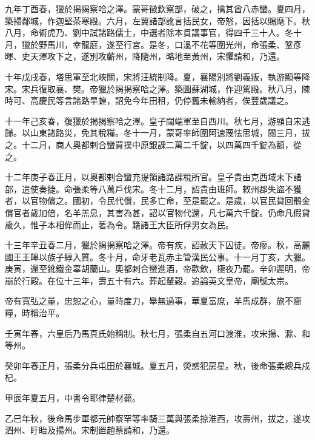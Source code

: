\begin{pinyinscope}
 九年丁酉春，獵於揭揭察哈之澤。蒙哥徵欽察部，破之，擒其酋八赤蠻。夏四月，築掃鄰城，作迦堅茶寒殿。六月，左翼諸部訛言括民女，帝怒，因括以賜麾下。秋八月，命術虎乃、劉中試諸路儒士，中選者除本貫議事官，得四千三十人。冬十月，獵於野馬川，幸龍庭，遂至行宮。是冬，口溫不花等圍光州，命張柔、鞏彥暉、史天澤攻下之，遂別攻蘄州，降隨州，略地至黃州，宋懼請和，乃還。



 十年戊戌春，塔思軍至北峽關，宋將汪統制降。夏，襄陽別將劉義叛，執游顯等降宋。宋兵復取襄、樊。帝獵於揭揭察哈之澤。築圖蘇湖城，作迎駕殿。秋八月，陳時可、高慶民等言諸路旱蝗，詔免今年田租，仍停舊未輸納者，俟豐歲議之。



 十一年己亥春，復獵於揭揭察哈之澤。皇子闊端軍至自西川。秋七月，游顯自宋逃歸。以山東諸路災，免其稅糧。冬十一月，蒙哥率師圍阿速蔑怯思城，閱三月，拔之。十二月，商人奧都剌合蠻買撲中原銀課二萬二千錠，以四萬四千錠為額，從之。



 十二年庚子春正月，以奧都剌合蠻充提領諸路課稅所官。皇子貴由克西域未下諸部，遣使奏捷。命張柔等八萬戶伐宋。冬十二月，詔貴由班師。敕州郡失盜不獲者，以官物償之。國初，令民代償，民多亡命，至是罷之。是歲，以官民貸回鶻金償官者歲加倍，名羊羔息，其害為甚，詔以官物代還，凡七萬六千錠。仍命凡假貸歲久，惟子本相侔而止，著為令。籍諸王大臣所俘男女為民。



 十三年辛丑春二月，獵於揭揭察哈之澤。帝有疾，詔赦天下囚徒。帝瘳。秋，高麗國王王皞以族子綧入質。冬十月，命牙老瓦赤主管漢民公事。十一月丁亥，大獵。庚寅，還至鈋鐵金辜胡蘭山。奧都剌合蠻進酒，帝歡飲，極夜乃罷。辛卯遲明，帝崩於行殿。在位十三年，壽五十有六。葬起輦穀。追謚英文皇帝，廟號太宗。



 帝有寬弘之量，忠恕之心，量時度力，舉無過事，華夏富庶，羊馬成群，旅不齎糧，時稱治平。



 壬寅年春，六皇后乃馬真氏始稱制。秋七月，張柔自五河口渡淮，攻宋揚、滁、和等州。



 癸卯年春正月，張柔分兵屯田於襄城。夏五月，熒惑犯房星。秋，後命張柔總兵戍杞。



 甲辰年夏五月，中書令耶律楚材薨。



 乙巳年秋，後命馬步軍都元帥察罕等率騎三萬與張柔掠淮西，攻壽州，拔之，遂攻泗州、盱眙及揚州。宋制置趙蔡請和，乃還。




\end{pinyinscope}
